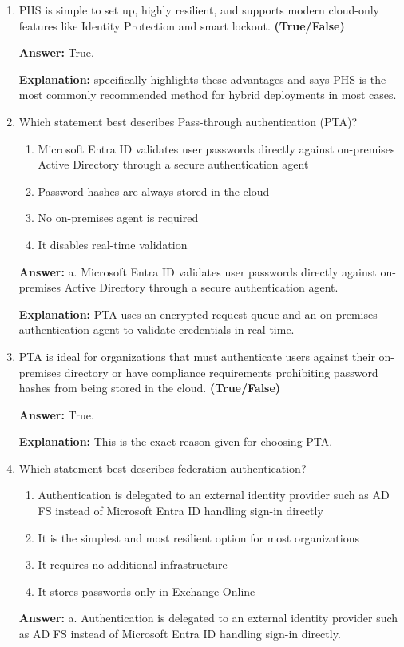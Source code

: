 \documentclass[10pt]{article}
\begin{document}
\begin{enumerate}[leftmargin=*]
\textbf{Explanation:} This is the exact description given for PHS.

\item PHS is simple to set up, highly resilient, and supports modern cloud-only features like Identity Protection and smart lockout. \textbf{(True/False)}

\textbf{Answer:} True.

\textbf{Explanation:} specifically highlights these advantages and says PHS is the most commonly recommended method for hybrid deployments in most cases.

\item Which statement best describes Pass-through authentication (PTA)?
\begin{enumerate}[label=\alph*., leftmargin=1.5em]
\item Microsoft Entra ID validates user passwords directly against on-premises Active Directory through a secure authentication agent
\item Password hashes are always stored in the cloud
\item No on-premises agent is required
\item It disables real-time validation
\end{enumerate}
\textbf{Answer:} a. Microsoft Entra ID validates user passwords directly against on-premises Active Directory through a secure authentication agent.

\textbf{Explanation:} PTA uses an encrypted request queue and an on-premises authentication agent to validate credentials in real time.

\item PTA is ideal for organizations that must authenticate users against their on-premises directory or have compliance requirements prohibiting password hashes from being stored in the cloud. \textbf{(True/False)}

\textbf{Answer:} True.

\textbf{Explanation:} This is the exact reason given for choosing PTA.

\item Which statement best describes federation authentication?
\begin{enumerate}[label=\alph*., leftmargin=1.5em]
\item Authentication is delegated to an external identity provider such as AD FS instead of Microsoft Entra ID handling sign-in directly
\item It is the simplest and most resilient option for most organizations
\item It requires no additional infrastructure
\item It stores passwords only in Exchange Online
\end{enumerate}
\textbf{Answer:} a. Authentication is delegated to an external identity provider such as AD FS instead of Microsoft Entra ID handling sign-in directly.


\end{enumerate}
\end{document}
